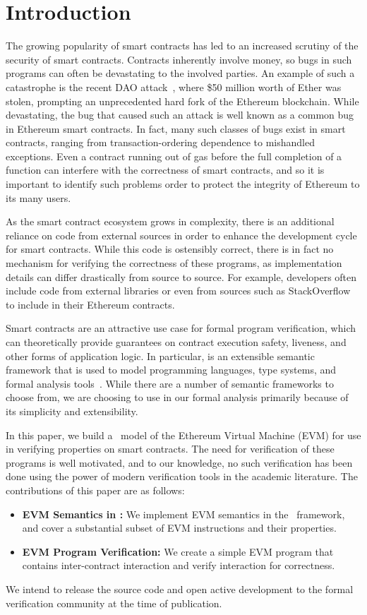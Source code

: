 \section{Introduction}
The growing popularity of smart contracts has led to an increased scrutiny of
the security of smart contracts. Contracts inherently involve money, so bugs in
such programs can often be devastating to the involved parties. An example of
such a catastrophe is the recent DAO attack~\cite{dao-attack}, where \$50
million worth of Ether was stolen, prompting an unprecedented hard fork of the
Ethereum blockchain. While devastating, the bug that caused such an attack is
well known as a common bug in Ethereum smart contracts. In fact, many such
classes of bugs exist in smart contracts, ranging from transaction-ordering
dependence to mishandled exceptions. Even a contract running out of gas before
the full completion of a function can interfere with the correctness of smart
contracts, and so it is important to identify such problems order to protect the integrity of Ethereum to its many users.

As the smart contract ecosystem grows in complexity, there is an additional
reliance on code from external sources in order to enhance the development cycle
for smart contracts. While this code is ostensibly correct, there is in fact no
mechanism for verifying the correctness of these programs, as implementation
details can differ drastically from source to source. For example,
developers often include code from external libraries or even from sources such as
StackOverflow to include in their Ethereum contracts.

Smart contracts are an attractive use case for formal program verification, which
can theoretically provide guarantees on contract execution safety,
liveness, and other forms of application logic. In particular, \K{} is an
extensible semantic framework that is used to model programming languages, type
systems, and formal analysis tools~\cite{rosu-serbanuta-2010-jlap}. While there
are a number of semantic frameworks to choose from, we are choosing to use \K{} in
our formal analysis primarily because of its simplicity and extensibility.

In this paper, we build a \K{}~model of the Ethereum Virtual Machine (EVM) for use
in verifying properties on smart contracts. The need for verification of these
programs is well motivated, and to our knowledge, no such verification has been
done using the power of modern verification tools in the academic literature.
The contributions of this paper are as follows:

\begin{itemize}
\item{\bf EVM Semantics in \K{}:} We implement EVM semantics in the \K{}~framework, and
cover a substantial subset of EVM instructions and their properties.
\item{\bf EVM Program Verification:} We create a simple EVM program that
contains inter-contract interaction and verify interaction for correctness.
\end{itemize}

We intend to release the source code and open active development to the formal
verification community at the time of publication.
